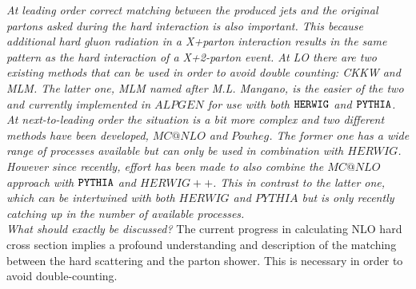 \textit{At leading order correct matching between the produced jets and the original partons asked during the hard interaction is also important. This because additional hard gluon radiation in a X+parton interaction results in the same pattern as the hard interaction of a X+2-parton event. At LO there are two existing methods that can be used in order to avoid double counting: CKKW and MLM. The latter one, MLM named after M.L. Mangano, is the easier of the two and currently implemented in $ALPGEN$ for use with both $\texttt{HERWIG}$ and $\texttt{PYTHIA}$.\\
At next-to-leading order the situation is a bit more complex and two different methods have been developed, $MC@NLO$ and $Powheg$. The former one has a wide range of processes available but can only be used in combination with $HERWIG$. However since recently, effort has been made to also combine the $MC@NLO$ approach with $\texttt{PYTHIA}$ and $HERWIG++$. This in contrast to the latter one, which can be intertwined with both $HERWIG$ and $PYTHIA$ but is only recently catching up in the number of available processes.}\\

\textit{What should exactly be discussed?}
The current progress in calculating NLO hard cross section implies a profound understanding and description of the matching between the hard scattering and the parton shower. This is necessary in order to avoid double-counting.


